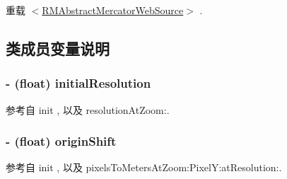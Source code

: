 重载 \hyperlink{protocol_r_m_abstract_mercator_web_source-p_ae5c62f0fed7dcdfd78aa9582bdec9b4b}{$<$\-R\-M\-Abstract\-Mercator\-Web\-Source$>$} .



\subsection{类成员变量说明}
\hypertarget{interface_r_m_w_m_s_source_a7c898e765ab5025ef2e17fcc3617027f}{
\subsubsection[{initial\-Resolution}]{\setlength{\rightskip}{0pt plus 5cm}-\/ (float) initial\-Resolution\hspace{0.3cm}{\ttfamily [protected]}}}\label{interface_r_m_w_m_s_source_a7c898e765ab5025ef2e17fcc3617027f}


参考自 init , 以及 resolution\-At\-Zoom\-:.

\hypertarget{interface_r_m_w_m_s_source_a9d22e05ba369ca54c36df2f244b2ecfb}{
\subsubsection[{origin\-Shift}]{\setlength{\rightskip}{0pt plus 5cm}-\/ (float) origin\-Shift\hspace{0.3cm}{\ttfamily [protected]}}}\label{interface_r_m_w_m_s_source_a9d22e05ba369ca54c36df2f244b2ecfb}


参考自 init , 以及 pixels\-To\-Meters\-At\-Zoom\-:\-Pixel\-Y\-:at\-Resolution\-:.



